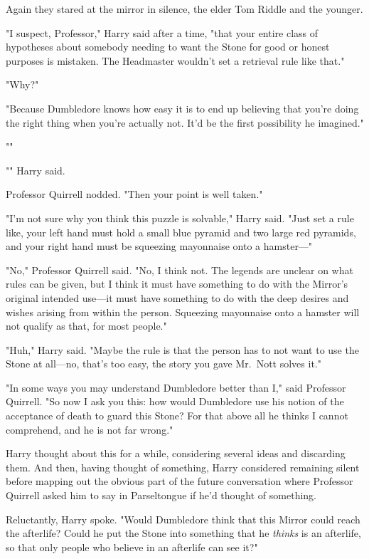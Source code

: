 Again they stared at the mirror in silence, the elder Tom Riddle and the
younger.

"I suspect, Professor," Harry said after a time, "that your entire class of
hypotheses about somebody needing to want the Stone for good or honest purposes
is mistaken. The Headmaster wouldn't set a retrieval rule like that."

"Why?"

"Because Dumbledore knows how easy it is to end up believing that you're doing
the right thing when you're actually not. It'd be the first possibility he
imagined."

""

"" Harry said.

Professor Quirrell nodded. "Then your point is well taken."

"I'm not sure why you think this puzzle is solvable," Harry said. "Just set a
rule like, your left hand must hold a small blue pyramid and two large red
pyramids, and your right hand must be squeezing mayonnaise onto a hamster---"

"No," Professor Quirrell said. "No, I think not. The legends are unclear on
what rules can be given, but I think it must have something to do with the
Mirror's original intended use---it must have something to do with the deep
desires and wishes arising from within the person. Squeezing mayonnaise onto a
hamster will not qualify as that, for most people."

"Huh," Harry said. "Maybe the rule is that the person has to not want to use
the Stone at all---no, that's too easy, the story you gave Mr.~Nott solves it."

"In some ways you may understand Dumbledore better than I," said Professor
Quirrell. "So now I ask you this: how would Dumbledore use his notion of the
acceptance of death to guard this Stone? For that above all he thinks I cannot
comprehend, and he is not far wrong."

Harry thought about this for a while, considering several ideas and discarding
them. And then, having thought of something, Harry considered remaining
silent{\el} before mapping out the obvious part of the future conversation
where Professor Quirrell asked him to say in Parseltongue if he'd thought of
something.

Reluctantly, Harry spoke. "Would Dumbledore think that this Mirror could reach
the afterlife? Could he put the Stone into something that he \emph{thinks} is
an afterlife, so that only people who believe in an afterlife can see it?"

